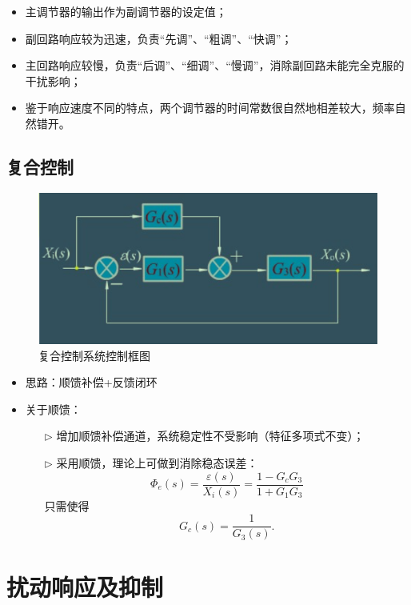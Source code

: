 \documentclass[14pt,a4paper]{article}
\theoremstyle{plain}
\theoremstyle{definition}
\theoremstyle{remark}
\theoremstyle{plain}
\theoremstyle{plain}
\theoremstyle{definition}
\begin{document}
			\begin{itemize}
				\item 主调节器的输出作为副调节器的设定值；
				\item 副回路响应较为迅速，负责``先调''、``粗调''、``快调''；
				\item 主回路响应较慢，负责``后调''、``细调''、``慢调''，消除副回路未能完全克服的干扰影响；
				\item 鉴于响应速度不同的特点，两个调节器的时间常数很自然地相差较大，频率自然错开。
			\end{itemize} 


		\subsection{复合控制}%
		\label{sub:复合控制}
	
			\begin{figure}[H]
				\centering
				\includegraphics[width=1\textwidth]{./figures/feedforward.png} 
				\caption{复合控制系统控制框图}
				\label{fig:ff}
			\end{figure}

			\begin{itemize}
				\item 思路：顺馈补偿+反馈闭环
				\item 关于顺馈：
					\begin{itemize}
						\item[$\triangleright$] 增加顺馈补偿通道，系统稳定性不受影响（特征多项式不变）；
						\item[$\triangleright$] 采用顺馈，理论上可做到消除稳态误差：
							\[
								\varPhi_e(s) = \dfrac{\varepsilon(s)}{X_{i}(s)} = \dfrac{1-G_c G_3}{1+G_1 G_3}
							\] 
							只需使得
							\[
								G_c(s) = \dfrac{1}{G_3(s)}
							.\] 
					\end{itemize}   
			\end{itemize}  


	\newpage
	\section{扰动响应及抑制}%
	\label{sec:扰动响应及抑制}
\end{document}
